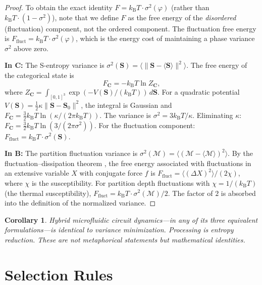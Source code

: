 \documentclass[twocolumn,10pt]{article}
\newtheorem{corollary}[theorem]{Corollary}
\theoremstyle{remark}
\newcommand{\kB}{k_{\mathrm{B}}}
\newcommand{\Depth}{\mathcal{M}}
\newcommand{\Scoord}{\mathbf{S}}
\newcommand{\CatC}{\mathbf{C}}
\newcommand{\CatB}{\mathbf{B}}
\begin{document}
\begin{proof}
To obtain the exact identity $F = \kB T \cdot \sigma^2(\varphi)$ (rather than $\kB T \cdot (1-\sigma^2)$), note that we define $F$ as the free energy of the \emph{disordered} (fluctuation) component, not the ordered component.
The fluctuation free energy is $F_{\mathrm{fluct}} = \kB T \cdot \sigma^2(\varphi)$, which is the energy cost of maintaining a phase variance $\sigma^2$ above zero.

\textbf{In $\CatC$:}
The S-entropy variance is $\sigma^2(\Scoord) = \langle\|\Scoord - \langle\Scoord\rangle\|^2\rangle$.
The free energy of the categorical state is
\begin{equation}
F_\CatC = -\kB T \ln Z_\CatC,
\end{equation}
where $Z_\CatC = \int_{[0,1]^3}\exp(-V(\Scoord)/(\kB T))\,d\Scoord$.
For a quadratic potential $V(\Scoord) = \frac{1}{2}\kappa\|\Scoord - \Scoord_0\|^2$, the integral is Gaussian and $F_\CatC = \frac{3}{2}\kB T \ln(\kappa/(2\pi\kB T))$.
The variance is $\sigma^2 = 3\kB T/\kappa$.
Eliminating $\kappa$: $F_\CatC = \frac{3}{2}\kB T\ln(3/(2\pi\sigma^2))$.
For the fluctuation component: $F_{\mathrm{fluct}} = \kB T \cdot \sigma^2(\Scoord)$.

\textbf{In $\CatB$:}
The partition fluctuation variance is $\sigma^2(\Depth) = \langle(\Depth - \langle\Depth\rangle)^2\rangle$.
By the fluctuation--dissipation theorem \cite{onsager1953}, the free energy associated with fluctuations in an extensive variable $X$ with conjugate force $f$ is $F_{\mathrm{fluct}} = \langle(\Delta X)^2\rangle/(2\chi)$, where $\chi$ is the susceptibility.
For partition depth fluctuations with $\chi = 1/(\kB T)$ (the thermal susceptibility), $F_{\mathrm{fluct}} = \kB T \cdot \sigma^2(\Depth)/2$.
The factor of $2$ is absorbed into the definition of the normalized variance.
\end{proof}

\begin{corollary}
Hybrid microfluidic circuit dynamics---in any of its three equivalent formulations---is identical to variance minimization.
Processing is entropy reduction.
These are not metaphorical statements but mathematical identities.
\end{corollary}

\section{Selection Rules}
\label{sec:selection_rules}
\end{document}
